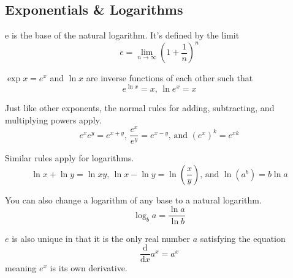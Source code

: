 \subsection{Exponentials \& Logarithms}
\begin{definition}
	e is the base of the natural logarithm. It's defined by the limit
	\begin{equation*}
		e = \lim\limits_{n\rightarrow\infty}{\left(1+\frac{1}{n}\right)^n}
	\end{equation*}
\end{definition}
$\exp{x} = e^x$ and $\ln{x}$ are inverse functions of each other such that
\begin{equation*}
	e^{\ln{x}} = x \text{, } \ln{e^x} = x
\end{equation*}

\noindent
Just like other exponents, the normal rules for adding, subtracting, and multiplying powers apply.
\begin{equation*}
	e^xe^y = e^{x+y}\text{, }\frac{e^x}{e^y}=e^{x-y}\text{, and }\left(e^x\right)^k=e^{xk}
\end{equation*}

\noindent
Similar rules apply for logarithms.
\begin{equation*}
	\ln{x}+\ln{y} = \ln{xy}\text{, }\ln{x}-\ln{y} = \ln{\left(\frac{x}{y}\right)}\text{, and }\ln{\left(a^b\right)}=b\ln{a}
\end{equation*}

\noindent
You can also change a logarithm of any base to a natural logarithm.
\begin{equation*}
	\log_{b}{a} = \frac{\ln{a}}{\ln{b}}
\end{equation*}

\noindent
$e$ is also unique in that it is the only real number $a$ satisfying the equation
\begin{equation*}
	\frac{\mathrm{d}}{\mathrm{d}x}a^x = a^x
\end{equation*}
meaning $e^x$ is its own derivative.